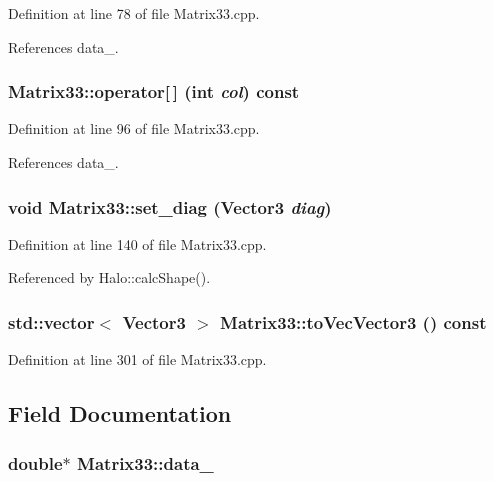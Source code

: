 Definition at line 78 of file Matrix33.cpp.



References data\_\-.

\subsubsection[{operator[]}]{ Matrix33::operator\mbox{[}$\,$\mbox{]} (int {\em col}) const}\label{classMatrix33_abe2e16fd1847f3fd356d3c498fc1002b}


Definition at line 96 of file Matrix33.cpp.



References data\_\-.

\subsubsection[{set\_\-diag}]{\setlength{\rightskip}{0pt plus 5cm}void Matrix33::set\_\-diag ({\bf Vector3} {\em diag})}\label{classMatrix33_a2038be8fa888552ec7b1bf0ab1b12feb}


Definition at line 140 of file Matrix33.cpp.



Referenced by Halo::calcShape().

\subsubsection[{toVecVector3}]{\setlength{\rightskip}{0pt plus 5cm}std::vector$<$ {\bf Vector3} $>$ Matrix33::toVecVector3 () const}\label{classMatrix33_a55757dc718226a9326e8866e38fd20fe}


Definition at line 301 of file Matrix33.cpp.



\subsection{Field Documentation}
\subsubsection[{data\_\-}]{\setlength{\rightskip}{0pt plus 5cm}double$\ast$ {\bf Matrix33::data\_\-}}\label{classMatrix33_a65ba09e71156f079fa39e4ce7991648c}



